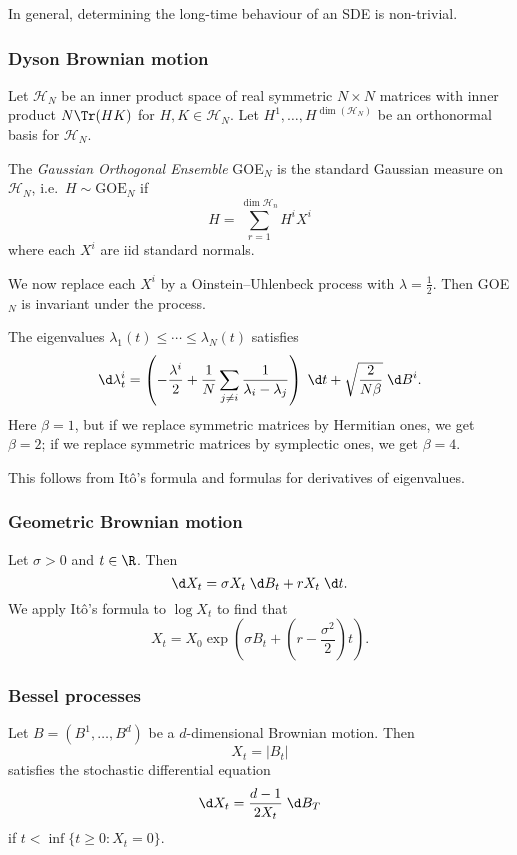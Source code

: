 \documentclass[a4paper]{article}
\begin{document}
In general, determining the long-time behaviour of an SDE is non-trivial.

\subsubsection*{Dyson Brownian motion}
Let $\mathcal{H}_N$ be an inner product space of real symmetric $N \times N$ matrices with inner product $N \Tr(HK)$ for $H, K \in \mathcal{H}_N$. Let $H^1, \ldots, H^{\dim(\mathcal{H}_N)}$ be an orthonormal basis for $\mathcal{H}_N$.

\begin{defi}
  The \emph{Gaussian Orthogonal Ensemble} GOE$_N$ is the standard Gaussian measure on $\mathcal{H}_N$, i.e.\ $H \sim \mathrm{GOE}_N$ if
  \[
    H = \sum_{r = 1}^{\dim \mathcal{H}_n} H^i X^i
  \]
  where each $X^i$ are iid standard normals.
\end{defi}

We now replace each $X^i$ by a Oinstein--Uhlenbeck process with $\lambda = \frac{1}{2}$. Then GOE$_N$ is invariant under the process.

\begin{thm}
  The eigenvalues $\lambda_1(t) \leq \cdots \leq \lambda_N(t)$ satisfies
  \[
    \d \lambda_t^i = \left(-\frac{\lambda^i}{2} + \frac{1}{N} \sum_{j \not= i} \frac{1}{\lambda_i - \lambda_j}\right)\;\d t + \sqrt{\frac{2}{N\beta}}\;\d B^i.
  \]
  Here $\beta = 1$, but if we replace symmetric matrices by Hermitian ones, we get $\beta = 2$; if we replace symmetric matrices by symplectic ones, we get $\beta = 4$.
\end{thm}
This follows from It\^o's formula and formulas for derivatives of eigenvalues.%

\subsubsection*{Geometric Brownian motion}
Let $\sigma > 0$ and $t \in \R$. Then
\[
  \d X_t = \sigma X_t \;\d B_t + r X_t \;\d t.
\]
We apply It\^o's formula to $\log X_t$ to find that
\[
  X_t = X_0 \exp \left(\sigma B_t + \left(r - \frac{\sigma^2}{2}\right)t\right).
\]
\subsubsection*{Bessel processes}
Let $B = (B^1, \ldots, B^d)$ be a $d$-dimensional Brownian motion. Then
\[
  X_t = |B_t|
\]
satisfies the stochastic differential equation
\[
  \d X_t = \frac{d - 1}{2X_t} \;\d B_T %
\]
if $t < \inf\{t \geq 0: X_t = 0\}$.
\end{document}

